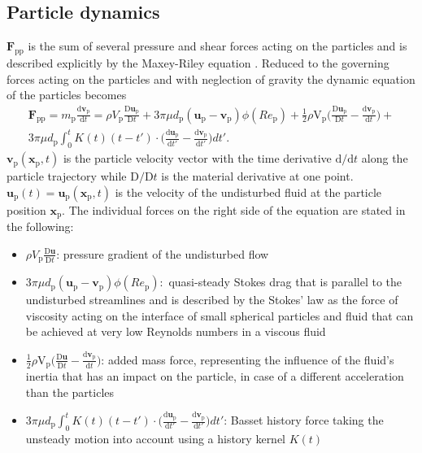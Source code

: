 \documentclass[11pt,a4paper,openany,oneside,parskip=half*]{article}
\renewcommand*\vec[1]{\boldsymbol{#1}}
\begin{document}
\subsection{Particle dynamics} %

$\vec{F}_\mathrm{pp}$ is the sum of several pressure and shear forces acting on the particles and is described explicitly by the Maxey-Riley equation \cite{EquationOfMotionForASmallRigidSphereInANonuniformFlow}.
Reduced to the governing forces acting on the particles and with neglection of gravity the dynamic equation of the particles becomes
\begin{multline} \label{navier_stokes_particle}
 \vec{F}_\mathrm{pp} = m_\mathrm{p} \frac{\mathrm{d}\vec{v}_\mathrm{p}}{\mathrm{d}t} =\rho V_\mathrm{p}\frac{\mathrm{D}\vec{u}_\mathrm{p}}{\mathrm{D}t} + 3 \pi \mu d_\mathrm{p}(\vec{u}_\mathrm{p}-\vec{v}_\mathrm{p})\phi(Re_\mathrm{p})+ \frac{1}{2}\rho \mathrm{V}_\mathrm{p} \biggl(\frac{\mathrm{D}\vec{u}_\mathrm{p}}{\mathrm{D}t}-\frac{\mathrm{d}\vec{v}_\mathrm{p}}{\mathrm{d}t}\biggl) +
\\ 3 \pi \mu d_\mathrm{p}\int_{0}^{t} K(t) (t-t') \cdot \biggl(\frac{\mathrm{d}\vec{u}_\mathrm{p}}{\mathrm{d}t'}- \frac{\mathrm{d}\vec{v}_\mathrm{p}}{\mathrm{d}t'}\biggl)dt'.
\end{multline}
$\vec{v}_\mathrm{p}(\vec{x}_\mathrm{p},t)$ is the particle velocity vector with the time derivative $\mathrm{d}/\mathrm{d}t$ along the particle trajectory while $\mathrm{D}/\mathrm{D}t$  is the material derivative at one point. $\vec{u}_\mathrm{p}(t) = \vec{u}_\mathrm{p}(\vec{x}_\mathrm{p},t)$ is the velocity of the undisturbed fluid at the particle position $\vec{x}_\mathrm{p}$.
The individual forces on the right side of the equation are stated in the following:
\begin{itemize} 
\item  $\rho V_\mathrm{p}\frac{\mathrm{D}\vec{u}}{\mathrm{D}t}$: \newline
pressure gradient of the undisturbed flow
\item $3 \pi \mu d_\mathrm{p}(\vec{u}_\mathrm{p}-\vec{v}_\mathrm{p})\phi(Re_\mathrm{p}):$\newline
quasi-steady Stokes drag that is parallel to the undisturbed streamlines and is described by the Stokes' law as the force of viscosity acting on the interface of small spherical particles and fluid that can be achieved at very low Reynolds numbers in a viscous fluid

\item $\frac{1}{2}\rho \mathrm{V}_\mathrm{p} \biggl(\frac{\mathrm{D}\vec{u}}{\mathrm{D}t}-\frac{\mathrm{d}\vec{v}_\mathrm{p}}{\mathrm{d}t}\biggl)$:\newline
added mass force, representing the influence of the fluid's inertia that has an impact on the particle, in case of a different acceleration than the particles
\item $3 \pi \mu d_\mathrm{p}\int_{0}^{t} K(t) (t-t') \cdot \biggl(\frac{\mathrm{d}\vec{u}_\mathrm{p}}{\mathrm{d}t'}- \frac{\mathrm{d}\vec{v}_\mathrm{p}}{\mathrm{d}t'}\biggl)dt'$: \newline
Basset history force taking the unsteady motion into account using a history kernel $K(t)$ 
\end{itemize}
\end{document}

